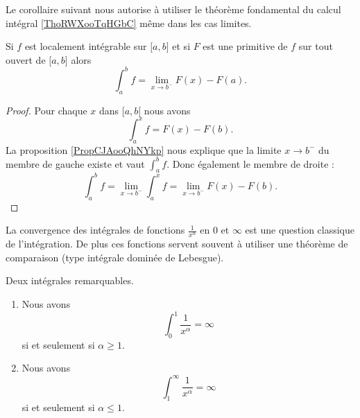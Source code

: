 Le corollaire suivant nous autorise à utiliser le théorème fondamental du calcul intégral \ref{ThoRWXooTqHGbC} même dans les cas limites.
\begin{corollary}   \label{CorMUIooXREleR}
    Si \( f\) est localement intégrable sur \( \mathopen[ a , b \mathclose]\) et si \( F\) est une primitive de \( f\) sur tout ouvert de \( \mathopen[ a , b \mathclose]\) alors
    \begin{equation}
        \int_a^bf=\lim_{x\to b^-} F(x)-F(a).
    \end{equation}
\end{corollary}

\begin{proof}
    Pour chaque \( x\) dans \( \mathopen[ a , b [\) nous avons
    \begin{equation}
        \int_a^xf=F(x)-F(b).
    \end{equation}
    La proposition \ref{PropCJAooQhNYkp} nous explique que la limite \( x\to b^-\) du membre de gauche existe et vaut \( \int_a^bf\). Donc également le membre de droite :
    \begin{equation}
        \int_a^bf=\lim_{x\to b^-} \int_a^xf=\lim_{x\to b^-} F(x)-F(b).
    \end{equation}
\end{proof}

La convergence des intégrales de fonctions \( \frac{1}{ x^{\alpha} }\) en \( 0\) et \( \infty\) est une question classique de l'intégration. De plus ces fonctions servent souvent à utiliser une théorème de comparaison (type intégrale dominée de Lebesgue).
\begin{proposition} \label{PropBKNooPDIPUc}
    Deux intégrales remarquables.
    \begin{enumerate}
        \item
            
            Nous avons 
    \begin{equation}
        \int_0^1\frac{1}{ x^\alpha }=\infty
    \end{equation}
    si et seulement si \( \alpha\geq 1\).

\item

    Nous avons
    \begin{equation}
        \int_1^{\infty}\frac{1}{ x^{\alpha} }=\infty
    \end{equation}
    si et seulement si \( \alpha\leq1\).

    \end{enumerate}
    
\end{proposition}

